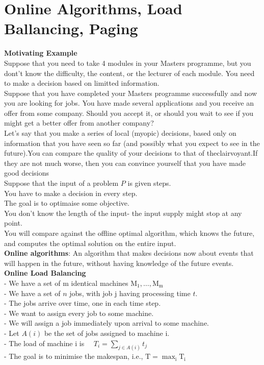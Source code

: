 \documentclass[onecolumn]{report}
\begin{document}
\section{Online Algorithms, Load Ballancing, Paging}
\textbf{Motivating Example}\\
Suppose that you need to take 4 modules in your Masters programme, but you dont't know the difficulty, the content, or the lecturer of each module. You need to make a decision based on limitted information.\\
Suppose that you have completed your Masters programme successfully and now you are looking for jobs. You have made several applications and you receive an offer from some company. Should you accept it, or should you wait to see if you might get a better offer from another company?\\
Let’s say that you make a series of local (myopic) decisions, based only on information that you have seen so far (and possibly what you expect to see in the future).You can compare the quality of your decisions to that of theclairvoyant.If they are not much worse, then you can convince yourself that you have made good decisions\\

\noindent
Suppose that the input of a problem $P$ is given steps.\\
You have to make a decision in every step. \\
The goal is to optimaise some objective.\\
You don't know the length of the input- the input supply might stop at any point.\\
You will compare against the offline optimal algorithm, which knows the future, and computes the optimal solution on the entire input.\\
\textbf{Online algorithms}: An algorithm that makes decisions now about events that will happen in the future, without having knowledge of the future events.\\
\textbf{Online Load Balancing}\\
- We have a set of $\mathrm{m}$ identical machines $\mathrm{M}_1, \ldots, \mathrm{M}_{\mathrm{m}}$\\
- We have a set of $n$ jobs, with job j having processing time $t$.\\
- \indent The jobs arrive over time, one in each time step.\\
- We want to assign every job to some machine.\\
- \indent We will assign a job immediately upon arrival to some machine.\\
- Let $A(i)$ be the set of jobs assigned to machine i.\\
- The load of machine $\mathrm{i}$ is $\quad T_i=\sum_{j \in A(i)} t_j$\\
- The goal is to minimise the makespan, i.e., $\mathrm{T}=\max _{\mathrm{i}} \mathrm{T}_{\mathrm{i}}$\\
\end{document}
